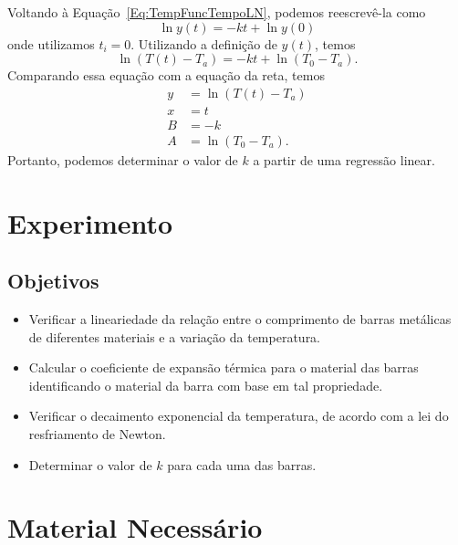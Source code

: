 Voltando à Equação~\ref{Eq:TempFuncTempoLN}, podemos reescrevê-la como
\begin{equation}
	\ln y(t) = -kt + \ln y(0)
\end{equation}
%
onde utilizamos $t_i = 0$. Utilizando a definição de $y(t)$, temos
\begin{equation}
	\ln (T(t) - T_a) = - kt + \ln(T_0 - T_a).
\end{equation}
%
Comparando essa equação com a equação da reta, temos
\begin{subequations}\label{Eq:LinResfriamentoNewton}
\begin{align}
	y &= \ln (T(t) - T_a) \\
	x &= t \\
	B &= -k \\
	A &= \ln(T_0 - T_a).
\end{align}
\end{subequations}
%
Portanto, podemos determinar o valor de $k$ a partir de uma regressão linear.

\section{Experimento}

\subsection{Objetivos}

\begin{itemize}
	\item Verificar a lineariedade da relação entre o comprimento de barras metálicas de diferentes materiais e a variação da temperatura.
	\item Calcular o coeficiente de expansão térmica para o material das barras identificando o material da barra com base em tal propriedade.
	\item Verificar o decaimento exponencial da temperatura, de acordo com a lei do resfriamento de Newton.
	\item Determinar o valor de $k$ para cada uma das barras.
\end{itemize}

\section{Material Necessário}


